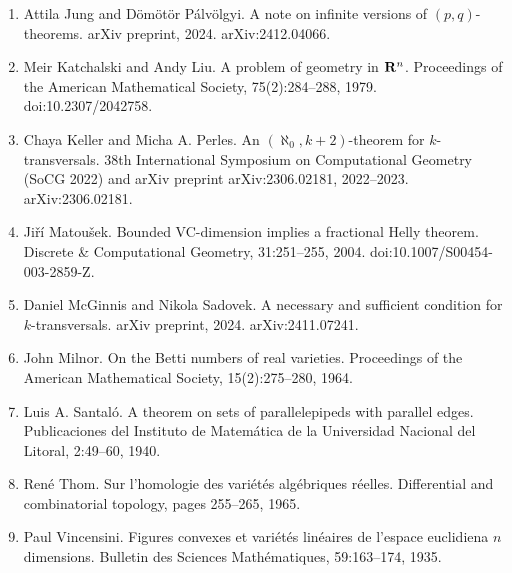 \begin{enumerate}
\item[]  [13]  Attila Jung and Dömötör Pálvölgyi.  A note on infinite versions of $(p,q)$-theorems.  arXiv preprint, 2024.  arXiv:2412.04066.  
\item[]  [14]  Meir Katchalski and Andy Liu.  A problem of geometry in ${\bf R}^{n}$.  Proceedings of the American Mathematical Society, 75(2):284–288, 1979.  doi:10.2307/2042758.  
\item[]  [15]  Chaya Keller and Micha A. Perles.  An $(\aleph_{0},k+2)$-theorem for $k$-transversals.  38th International Symposium on Computational Geometry (SoCG 2022) and arXiv preprint arXiv:2306.02181, 2022–2023.  arXiv:2306.02181.  
\item[]  [16]  Jiří Matoušek.  Bounded VC-dimension implies a fractional Helly theorem.  Discrete \& Computational Geometry, 31:251–255, 2004.  doi:10.1007/S00454-003-2859-Z.  
\item[]  [17]  Daniel McGinnis and Nikola Sadovek.  A necessary and sufficient condition for $k$-transversals.  arXiv preprint, 2024.  arXiv:2411.07241.  
\item[]  [18]  John Milnor.  On the Betti numbers of real varieties.  Proceedings of the American Mathematical Society, 15(2):275–280, 1964.  
\item[]  [19]  Luis A. Santaló.  A theorem on sets of parallelepipeds with parallel edges.  Publicaciones del Instituto de Matemática de la Universidad Nacional del Litoral, 2:49–60, 1940.  
\item[]  [20]  René Thom.  Sur l’homologie des variétés algébriques réelles.  Differential and combinatorial topology, pages 255–265, 1965.  
\item[]  [21]  Paul Vincensini.  Figures convexes et variétés linéaires de l’espace euclidiena $n$ dimensions.  Bulletin des Sciences Mathématiques, 59:163–174, 1935.  
\end{enumerate}
\par

